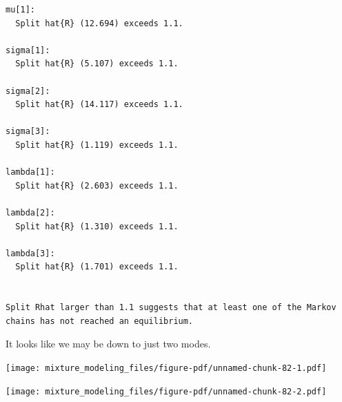 \documentclass[
  letterpaper,
  DIV=11,
  numbers=noendperiod]{scrartcl}
\newenvironment{Shaded}{\begin{snugshade}}{\end{snugshade}}
\newcommand{\ControlFlowTok}[1]{\textcolor[rgb]{0.00,0.23,0.31}{#1}}
\newcommand{\DecValTok}[1]{\textcolor[rgb]{0.68,0.00,0.00}{#1}}
\newcommand{\FunctionTok}[1]{\textcolor[rgb]{0.28,0.35,0.67}{#1}}
\newcommand{\NormalTok}[1]{\textcolor[rgb]{0.00,0.23,0.31}{#1}}
\newcommand{\OtherTok}[1]{\textcolor[rgb]{0.00,0.23,0.31}{#1}}
\newcommand{\SpecialCharTok}[1]{\textcolor[rgb]{0.37,0.37,0.37}{#1}}
\newcommand{\StringTok}[1]{\textcolor[rgb]{0.13,0.47,0.30}{#1}}
\begin{document}
\begin{verbatim}
mu[1]:
  Split hat{R} (12.694) exceeds 1.1.

sigma[1]:
  Split hat{R} (5.107) exceeds 1.1.

sigma[2]:
  Split hat{R} (14.117) exceeds 1.1.

sigma[3]:
  Split hat{R} (1.119) exceeds 1.1.

lambda[1]:
  Split hat{R} (2.603) exceeds 1.1.

lambda[2]:
  Split hat{R} (1.310) exceeds 1.1.

lambda[3]:
  Split hat{R} (1.701) exceeds 1.1.


Split Rhat larger than 1.1 suggests that at least one of the Markov
chains has not reached an equilibrium.
\end{verbatim}

It looks like we may be down to just two modes.

\begin{Shaded}
\end{Shaded}

\texttt{[image: mixture\_modeling\_files/figure-pdf/unnamed-chunk-82-1.pdf]}

\begin{Shaded}
\end{Shaded}

\texttt{[image: mixture\_modeling\_files/figure-pdf/unnamed-chunk-82-2.pdf]}
\end{document}
